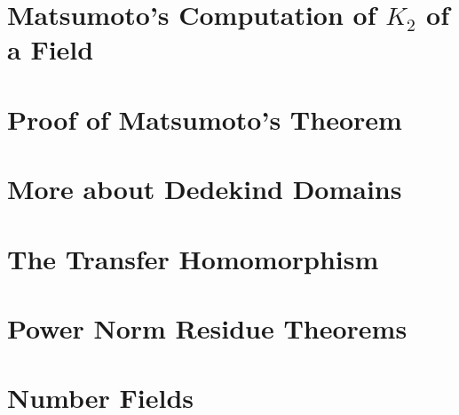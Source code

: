 \section{Matsumoto's Computation of $K_2$ of a Field}

\section{Proof of Matsumoto's Theorem}

\section{More about Dedekind Domains}

\section{The Transfer Homomorphism}

\section{Power Norm Residue Theorems}

\section{Number Fields}
